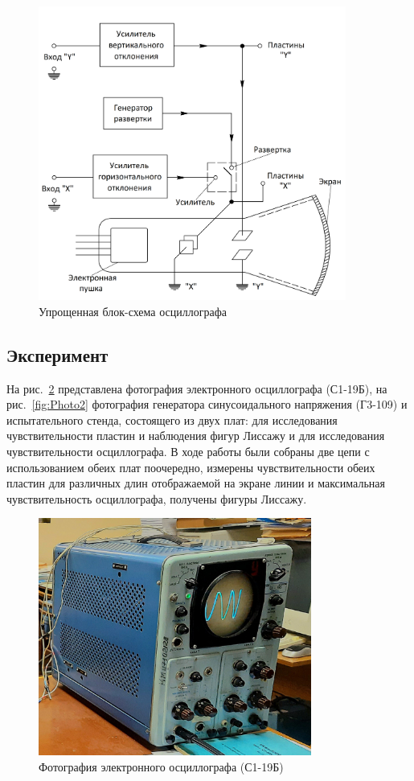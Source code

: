 \begin{figure}[H]
\centering
\includegraphics[width=0.9\textwidth]{Scheme2.png}
\caption{Упрощенная блок-схема осциллографа}
\label{fig:Scheme2}
\end{figure}

\subsection{Эксперимент}
На рис.~\ref{fig:Photo1} представлена фотография электронного осциллографа (С1-19Б), на рис.~\ref{fig:Photo2} фотография генератора синусоидального напряжения (Г3-109) и испытательного стенда, состоящего из двух плат: для исследования чувствительности пластин и наблюдения фигур Лиссажу и для исследования чувствительности осциллографа. В ходе работы были собраны две цепи с использованием обеих плат поочередно, измерены чувствительности обеих пластин для различных длин отображаемой на экране линии и максимальная чувствительность осциллографа, получены фигуры Лиссажу.

\begin{figure}[H]
\centering
\includegraphics[width=0.8\textwidth]{Photo1.jpg}
\caption{Фотография электронного осциллографа (С1-19Б)}
\label{fig:Photo1}
\end{figure}

